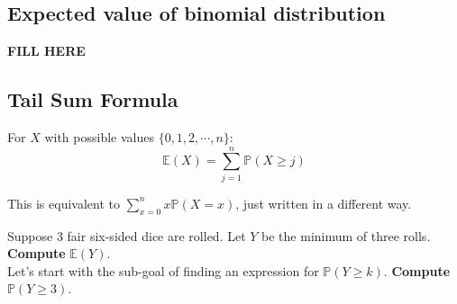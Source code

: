 \documentclass[titlepage, 12pt, leqno]{article}
\begin{document}
\subsection{Expected value of binomial distribution}
\textbf{FILL HERE}

\subsection{Tail Sum Formula}
For $X$ with possible values $\{0,1,2, \cdots ,n\}$:
\[
    \mathbb{E}(X) = \sum_{j=1}^{n}\mathbb{P}(X \ge j)
\]

This is equivalent to $\sum_{x=0}^{n}x \mathbb{P}(X=x)$, just written in a 
different way.

\begin{ex}
    Suppose 3 fair six-sided dice are rolled. Let $Y$ be the minimum of three 
    rolls. \textbf{Compute} $ \mathbb{E}(Y)$.\\[.1in]
    Let's start with the sub-goal of finding an expression for $ \mathbb{P}(Y
    \ge k)$. \textbf{Compute} $ \mathbb{P}(Y \ge 3)$.
\end{ex}
\end{document}
